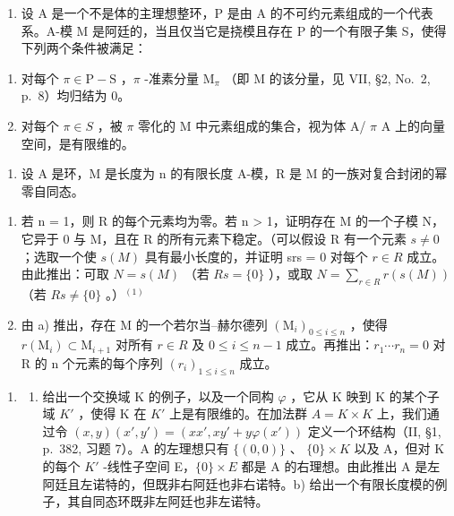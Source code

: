 
\begin{enumerate}
\def\labelenumi{\arabic{enumi})}
\tightlist
\item
  设 A 是一个不是体的主理想整环，P 是由 A 的不可约元素组成的一个代表系。A-模 M 是阿廷的，当且仅当它是挠模且存在 P 的一个有限子集 S，使得下列两个条件被满足：
\end{enumerate}

\begin{enumerate}
\def\labelenumi{(\roman{enumi})}
\item
  对每个 \(\pi \in \mathrm{P} - \mathrm{S}\) ，\(\pi\) -准素分量 \(\mathrm{M}_{\pi}\) （即 \(\mathrm{M}\) 的该分量，见 VII, §2, No.~2, p.~8）均归结为 0。
\item
  对每个 \(\pi\in S\) ，被 \(\pi\) 零化的 M 中元素组成的集合，视为体 A/ \(\pi\) A 上的向量空间，是有限维的。
\end{enumerate}

\begin{enumerate}
\def\labelenumi{\arabic{enumi})}
\setcounter{enumi}{1}
\tightlist
\item
  设 A 是环，M 是长度为 n 的有限长度 A-模，R 是 M 的一族对复合封闭的幂零自同态。
\end{enumerate}

\begin{enumerate}
\def\labelenumi{\alph{enumi})}
\item
  若 n = 1，则 R 的每个元素均为零。若 n \textgreater{} 1，证明存在 M 的一个子模 N，它异于 0 与 M，且在 R 的所有元素下稳定。（可以假设 R 有一个元素 \(s \neq 0\) ；选取一个使 \(s(M)\) 具有最小长度的，并证明 srs = 0 对每个 \(r \in R\) 成立。由此推出：可取 \(N = s(M)\) （若 \(Rs = \{0\}\) ），或取 \(N = \sum_{r \in R} r(s(M))\) （若 \(Rs \neq \{0\}\) 。）\(^{(1)}\)
\item
  由 a) 推出，存在 M 的一个若尔当--赫尔德列 \((\mathrm{M}_{i})_{0\leqslant i\leqslant n}\) ，使得 \(r(\mathrm{M}_{i})\subset\mathrm{M}_{i+1}\) 对所有 \(r\in R\) 及 \(0\leqslant i\leqslant n-1\) 成立。再推出：\(r_{1}\cdots r_{n}=0\) 对 R 的 n 个元素的每个序列 \((r_{i})_{1\leqslant i\leqslant n}\) 成立。
\end{enumerate}

\begin{enumerate}
\def\labelenumi{\arabic{enumi})}
\setcounter{enumi}{2}
\tightlist
\item
  \begin{enumerate}
  \def\labelenumii{\alph{enumii})}
  \tightlist
  \item
    给出一个交换域 K 的例子，以及一个同构 \(\varphi\) ，它从 K 映到 K 的某个子域 \(K'\) ，使得 K 在 \(K'\) 上是有限维的。在加法群 \(A = K \times K\) 上，我们通过令 \((x, y)(x', y') = (xx', xy' + y\varphi(x'))\) 定义一个环结构（II, §1, p.~382, 习题 7）。A 的左理想只有 \(\{(0, 0)\}\) 、 \(\{0\} \times K\) 以及 A，但对 K 的每个 \(K'\) -线性子空间 E，\(\{0\} \times E\) 都是 A 的右理想。由此推出 A 是左阿廷且左诺特的，但既非右阿廷也非右诺特。b) 给出一个有限长度模的例子，其自同态环既非左阿廷也非左诺特。
  \end{enumerate}
\end{enumerate}

